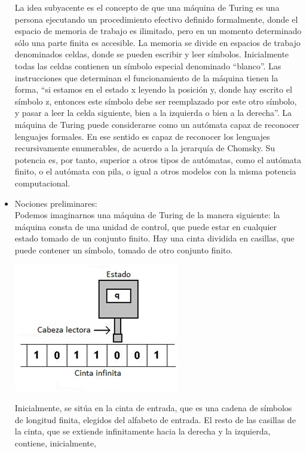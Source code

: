 \documentclass[12pt,a4paper,spanish]{book}
\begin{document}
\begin{itemize}
La idea subyacente es el concepto de que una m\'aquina de Turing es una persona ejecutando un procedimiento efectivo definido formalmente, donde el espacio de memoria de trabajo es ilimitado, pero en un momento determinado s\'olo una parte finita es accesible. La memoria se divide en espacios de trabajo denominados celdas, donde se pueden escribir y leer s\'imbolos. \newline Inicialmente todas las celdas contienen un s\'imbolo especial denominado ``blanco''. Las instrucciones que determinan el funcionamiento de la m\'aquina tienen la forma, ``si estamos en el estado x leyendo la posici\'on y, donde hay escrito el s\'imbolo z, entonces este s\'imbolo debe ser reemplazado por este otro s\'imbolo, y pasar a leer la celda siguiente, bien a la izquierda o bien a la derecha''.
\newline La m\'aquina de Turing puede considerarse como un aut\'omata capaz de reconocer lenguajes formales. En ese sentido es capaz de reconocer los lenguajes recursivamente enumerables, de acuerdo a la jerarqu\'ia de Chomsky. Su potencia es, por tanto, superior a otros tipos de aut\'omatas, como el aut\'omata finito, o el aut\'omata con pila, o igual a otros modelos con la misma potencia computacional.
\item Nociones preliminares: \\
\newline
Podemos imaginarnos una m\'aquina de Turing de la manera siguiente: la m\'aquina
consta de una unidad de control, que puede estar en cualquier estado tomado de un
conjunto finito. Hay una cinta dividida en casillas, que puede contener un s\'imbolo,
tomado de otro conjunto finito.
\begin{center}
\includegraphics{turi1.jpg}
\end{center}
Inicialmente, se sit\'ua en la cinta de entrada, que es una cadena de s\'imbolos de
longitud finita, elegidos del alfabeto de entrada. El resto de las casillas de la cinta,
que se extiende infinitamente hacia la derecha y la izquierda, contiene, inicialmente,

\end{itemize}
\end{document}
